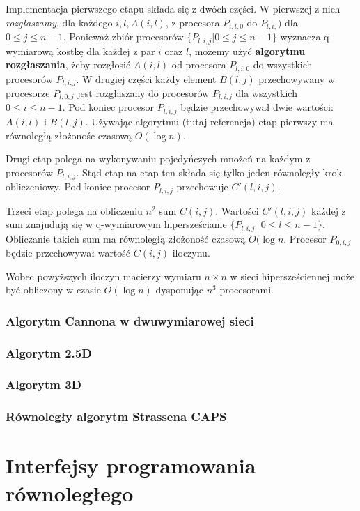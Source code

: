 \documentclass[a4paper,oneside,leqno,12pt]{book}
\theoremstyle{definition}
\theoremstyle{plain}
\theoremstyle{remark}
\begin{document}
Implementacja pierwszego etapu składa się z dwóch części. W pierwszej z nich \emph{rozgłaszamy}, dla każdego \(i, l, A(i,l)\), z procesora \(P_{i,l,0}\) do \(P_{l,i,})\) dla \(0\leq j \leq n-1\). Ponieważ zbiór procesorów \(\{P_{l,i,j}|0\leq j \leq n-1\}\) wyznacza q-wymiarową kostkę dla każdej z par \(i\) oraz \(l\), możemy użyć \textbf{algorytmu rozgłaszania}, żeby rozgłosić \(A(i,l)\) od procesora \(P_{l,i,0}\) do wszystkich procesorów \(P_{l,i,j}\).
W drugiej części każdy element \(B(l,j)\) przechowywany w procesorze \(P_{l,0,j}\) jest rozgłaszany do procesorów \(P_{l,i,j}\) dla wszystkich \(0\leq i \leq n-1\). Pod koniec procesor \(P_{l,i,j}\) będzie przechowywał dwie wartości: \(A(i,l)\) i \(B(l,j)\). Używając algorytmu (tutaj referencja) etap pierwszy ma równoległą złożonośc czasową \(O(\log{n})\).

Drugi etap polega na wykonywaniu pojedyńczych mnożeń na każdym z procesorów \(P_{l,i,j}\). Stąd etap na etap ten składa się tylko jeden równoległy krok obliczeniowy. Pod koniec procesor \(P_{l,i,j}\) przechowuje \(C'(l,i,j)\).

Trzeci etap polega na obliczeniu \(n^2\) sum \(C(i,j)\). Wartości \(C'(l,i,j)\) każdej z sum znajudują się w q-wymiarowym hipersześcianie \(\{P_{l,i,j}\,|\,0\leq l\leq n-1\}\). Obliczanie takich sum ma równoległą złożoność czasową \(O(\log{n}\). Procesor \(P_{0,i,j}\) będzie przechowywał wartość \(C(i,j)\) iloczynu.

Wobec powyższych iloczyn macierzy wymiaru \(n \times n\) w sieci hipersześciennej może być obliczony w czasie \(O(\log{n})\) dysponując \(n^3\) procesorami.
\subsection{Algorytm Cannona w dwuwymiarowej sieci}
\cite{communication_efficient}
\subsection{Algorytm 2.5D}
\cite{Solomonik:EECS-2011-72}
\subsection{Algorytm 3D}
\cite{communication_efficient}
\subsection{Równoległy algorytm Strassena CAPS}
\cite{DBLP:journals/corr/abs-1202-3173}
\chapter{Interfejsy programowania równoległego}
\end{document}
